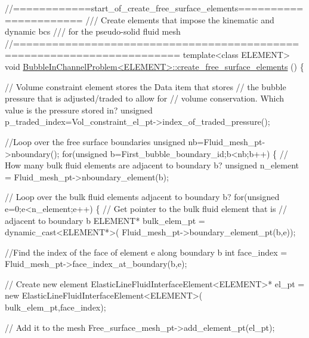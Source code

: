  
\begin{DoxyCodeInclude}
\textcolor{comment}{//============start\_of\_create\_free\_surface\_elements======================}
\textcolor{comment}{/// Create elements that impose the kinematic and dynamic bcs}
\textcolor{comment}{}\textcolor{comment}{/// for the pseudo-solid fluid mesh}
\textcolor{comment}{}\textcolor{comment}{//=======================================================================}
\textcolor{keyword}{template}<\textcolor{keyword}{class} ELEMENT>
\textcolor{keywordtype}{void} \hyperlink{classBubbleInChannelProblem_a9a5a34516352db3153baa52ccb204b62}{BubbleInChannelProblem<ELEMENT>::create\_free\_surface\_elements}
      ()
\{ 

 \textcolor{comment}{// Volume constraint element stores the Data item that stores}
 \textcolor{comment}{// the bubble pressure that is adjusted/traded to allow for}
 \textcolor{comment}{// volume conservation. Which value is the pressure stored in?}
 \textcolor{keywordtype}{unsigned} p\_traded\_index=Vol\_constraint\_el\_pt->index\_of\_traded\_pressure();

 \textcolor{comment}{//Loop over the free surface boundaries}
 \textcolor{keywordtype}{unsigned} nb=Fluid\_mesh\_pt->nboundary();
 \textcolor{keywordflow}{for}(\textcolor{keywordtype}{unsigned} b=First\_bubble\_boundary\_id;b<nb;b++)
  \{
   \textcolor{comment}{// How many bulk fluid elements are adjacent to boundary b?}
   \textcolor{keywordtype}{unsigned} n\_element = Fluid\_mesh\_pt->nboundary\_element(b);
   
   \textcolor{comment}{// Loop over the bulk fluid elements adjacent to boundary b?}
   \textcolor{keywordflow}{for}(\textcolor{keywordtype}{unsigned} e=0;e<n\_element;e++)
    \{
     \textcolor{comment}{// Get pointer to the bulk fluid element that is }
     \textcolor{comment}{// adjacent to boundary b}
     ELEMENT* bulk\_elem\_pt = \textcolor{keyword}{dynamic\_cast<}ELEMENT*\textcolor{keyword}{>}(
      Fluid\_mesh\_pt->boundary\_element\_pt(b,e));
     
     \textcolor{comment}{//Find the index of the face of element e along boundary b}
     \textcolor{keywordtype}{int} face\_index = Fluid\_mesh\_pt->face\_index\_at\_boundary(b,e);
     
     \textcolor{comment}{// Create new element}
     ElasticLineFluidInterfaceElement<ELEMENT>* el\_pt =
      \textcolor{keyword}{new} ElasticLineFluidInterfaceElement<ELEMENT>(
       bulk\_elem\_pt,face\_index);   
     
     \textcolor{comment}{// Add it to the mesh}
     Free\_surface\_mesh\_pt->add\_element\_pt(el\_pt);
     

\end{DoxyCodeInclude}
